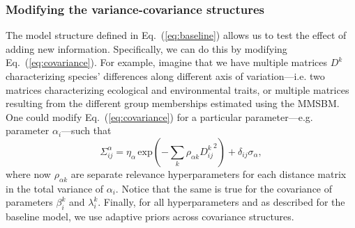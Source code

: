 \documentclass[11pt, a4paper]{article}
\begin{document}
\subsubsection*{Modifying the variance-covariance structures}
The model structure defined in Eq.~(\ref{eq:baseline}) allows us to test the effect of adding new information. Specifically, we can do this by modifying Eq.~(\ref{eq:covariance}). For example, imagine that we have multiple matrices $D^k$ characterizing species' differences along different axis of variation---i.e. two matrices characterizing ecological and environmental traits, or multiple matrices resulting from the different group memberships estimated using the MMSBM. One could modify Eq.~(\ref{eq:covariance}) for a particular parameter---e.g. parameter $\alpha_i$---such that
\begin{equation} 
\Sigma^{\alpha}_{ij} = \eta_{\alpha}\,\text{exp}\left(-\sum_k\rho_{\alpha k} {D^{k}_{ij}}^2\right) + \delta_{ij} \sigma_{\alpha} ,
\label{eq:covariance-complex}
\end{equation}
where now $\rho_{\alpha k}$ are separate relevance hyperparameters for each distance matrix in the total variance of $\alpha_i$. Notice that the same is true for the covariance of parameters $\beta_i^k$ and $\lambda_i^k$. Finally, for all hyperparameters and as described for the baseline model, we use adaptive priors across covariance structures.
\end{document}
